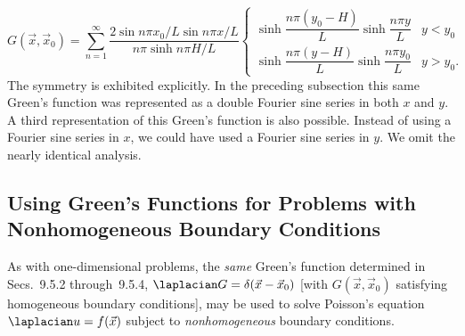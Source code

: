 \begin{equation}
\label{eq:9.5.21}
G(\vec{x},\vec{x}_0) = \sum_{n=1}^{\infty} \frac{2\sin n\pi x_0/L\sin n\pi x/L}{n\pi\sinh n\pi H/L} \begin{cases}
\sinh\dfrac{n\pi(y_0-H)}{L}\sinh\dfrac{n\pi y}{L} & y < y_0 \\[8pt]
\sinh\dfrac{n\pi(y-H)}{L}\sinh\dfrac{n\pi y_0}{L} & y > y_0.
\end{cases}
\end{equation}
The symmetry is exhibited explicitly.  In the preceding subsection this same Green's function was represented as a double Fourier sine series in both $x$ and $y$.  A third representation of this Green's function is also possible.  Instead of using a Fourier sine series in $x$, we could have used a Fourier sine series in $y$.  We omit the nearly identical analysis.

\subsection{Using Green's Functions for Problems with Nonhomogeneous Boundary Conditions}
\label{sec:greens-poisson-nonhomog}

As with one-dimensional problems, the \emph{same} Green's function determined in Secs.~9.5.2 through~9.5.4, $\laplacian G = \delta(\vec{x}-\vec{x}_0)$ [with $G(\vec{x},\vec{x}_0)$ satisfying homogeneous boundary conditions], may be used to solve Poisson's equation $\laplacian u = f(\vec{x})$ subject to \emph{nonhomogeneous} boundary conditions.

